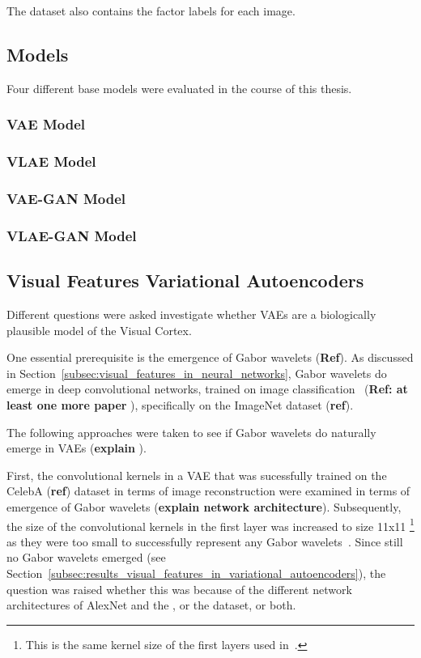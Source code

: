 The dataset also contains the factor labels for each image.

\subsection{Models}\label{subsec:models}

Four different base models were evaluated in the course of this thesis.

\subsubsection{VAE Model}

\subsubsection{VLAE Model}

\subsubsection{VAE-GAN Model}

\subsubsection{VLAE-GAN Model}

\subsection{Visual Features Variational Autoencoders}\label{subsec:visual-features-variational-autoencoders}
Different questions were asked investigate whether \acp{VAE} are a biologically plausible model of the Visual Cortex.

One essential prerequisite is the emergence of Gabor wavelets (\textbf{Ref}).
As discussed in Section~\ref{subsec:visual_features_in_neural_networks}, Gabor wavelets do emerge in deep convolutional networks, trained on image classification~\citep{krizhevsky2012imagenet} (\textbf{Ref: at least one more paper }), specifically on the ImageNet dataset (\textbf{ref}).\par
The following approaches were taken to see if Gabor wavelets do naturally emerge in \acp{VAE} (\textbf{explain }).\par
First, the convolutional kernels in a \ac{VAE} that was sucessfully trained on the CelebA (\textbf{ref}) dataset in terms of image reconstruction were examined in terms of emergence of Gabor wavelets (\textbf{explain network architecture}).
Subsequently, the size of the convolutional kernels in the first layer was increased to size 11x11 \footnote{This is the same kernel size of the first layers used in~\citet{krizhevsky2012imagenet}.} as they were too small to successfully represent any Gabor wavelets~\citep{han2019variational}.
Since still no Gabor wavelets emerged (see Section~\ref{subsec:results_visual_features_in_variational_autoencoders}), the question was raised whether this was because of the different network architectures of AlexNet and the , or the dataset, or both.

